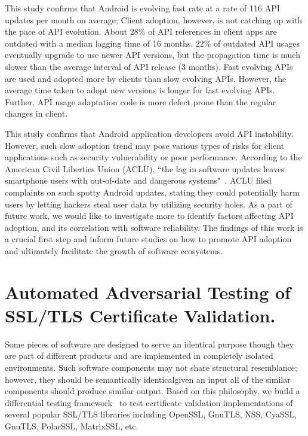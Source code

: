 \documentclass[a4paper, 11pt]{article}
\begin{document}
\begin{small}
This study confirms that Android is evolving fast rate at a rate of 116 API updates per month on average; 
Client adoption, however, is not catching up with the pace of API evolution. About 28\% of API references in 
client apps are outdated with a median lagging time of 16 months.  22\% of outdated API usages eventually upgrade to 
use newer API versions, but the propagation time is much slower than the average interval of API release (3 months). 
Fast evolving APIs are used and adopted more by clients than slow evolving APIs. However, the average time taken to adopt 
new versions is longer for fast evolving APIs. Further, API usage adaptation code is more defect prone than the regular changes 
in client. 

This study confirms that Android application developers avoid API instability. However, such slow adoption trend may pose various 
types of risks for client applications such as security vulnerability or poor performance. 
According to the American Civil Liberties Union (ACLU), ``the lag in software updates leaves smartphone users with out-of-date and dangerous systems"~\cite{ACLU}.  ACLU filed complaints on such spotty Android updates, stating they could potentially harm users by letting hackers 
steal user data by utilizing security holes. As a part of future work, we would like to investigate more to identify factors affecting API adoption, 
and its correlation with software reliability. The findings of this work is a crucial first step and inform future studies on how to promote 
API adoption and ultimately facilitate the growth of software ecosystems.



\section*{\small Automated Adversarial Testing of SSL/TLS Certificate Validation.}

Some pieces of software are designed to serve an identical purpose though they are part 
of different products and are implemented in completely isolated environments. Such software 
components may not share structural resemblance; however, they should be semantically 
identical\textemdash given an input all of the similar components should produce similar output. 
Based on this philosophy, we build a differential testing framework~\cite{KeemanDifferentialTesting1998} 
to test certificate validation implementations of several popular SSL/TLS libraries including OpenSSL, 
GnuTLS, NSS, CyaSSL, GnuTLS, PolarSSL, MatrixSSL, etc.


\end{small}
\end{document}
